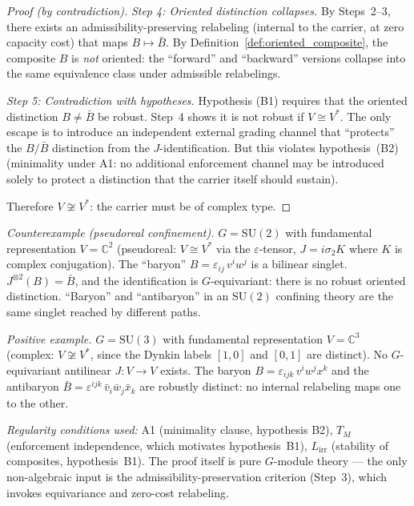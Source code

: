 \documentclass[11pt,a4paper]{article}
\theoremstyle{definition}
\newcommand{\SU}{\mathrm{SU}}
\begin{document}
\begin{proof}[Proof (by contradiction)]
\textit{Step 4: Oriented distinction collapses.}\quad
By Steps~2--3, there exists an admissibility-preserving relabeling
(internal to the carrier, at zero capacity cost) that maps $B \mapsto \bar{B}$.
By Definition~\ref{def:oriented_composite}, the composite $B$ is
\emph{not} oriented: the ``forward'' and ``backward'' versions collapse
into the same equivalence class under admissible relabelings.

\textit{Step 5: Contradiction with hypotheses.}\quad
Hypothesis (B1) requires that the oriented distinction $B \ne \bar{B}$ be
robust.  Step~4 shows it is not robust if $V \cong V^*$.  The only escape
is to introduce an independent external grading channel that ``protects''
the $B / \bar{B}$ distinction from the $J$-identification.  But this
violates hypothesis~(B2) (minimality under A1: no additional enforcement
channel may be introduced solely to protect a distinction that the carrier
itself should sustain).

Therefore $V \not\cong V^*$: the carrier must be of complex type.
\end{proof}

\noindent\textit{Counterexample (pseudoreal confinement).}\quad
$G = \SU(2)$ with fundamental representation $V = \mathbb{C}^2$
(pseudoreal: $V \cong V^*$ via the $\varepsilon$-tensor, $J = i\sigma_2 K$
where $K$ is complex conjugation).  The ``baryon'' $B = \varepsilon_{ij}\, v^i w^j$
is a bilinear singlet.  $J^{\otimes 2}(B) = \bar{B}$, and the identification
is $G$-equivariant: there is no robust oriented distinction.
``Baryon'' and ``antibaryon'' in an $\SU(2)$ confining theory are the
same singlet reached by different paths.

\smallskip\noindent\textit{Positive example.}\quad
$G = \SU(3)$ with fundamental representation $V = \mathbb{C}^3$
(complex: $V \not\cong V^*$, since the Dynkin labels $[1,0]$ and
$[0,1]$ are distinct).  No $G$-equivariant antilinear $J: V \to V$ exists.
The baryon $B = \varepsilon_{ijk}\, v^i w^j x^k$ and the antibaryon
$\bar{B} = \varepsilon^{ijk}\, \bar{v}_i \bar{w}_j \bar{x}_k$ are
robustly distinct: no internal relabeling maps one to the other.

\smallskip\noindent\textit{Regularity conditions used:}
A1 (minimality clause, hypothesis B2), $T_M$ (enforcement independence,
which motivates hypothesis~B1), $L_{\mathrm{irr}}$ (stability of composites,
hypothesis~B1).  The proof itself is pure $G$-module theory --- the only
non-algebraic input is the admissibility-preservation criterion (Step~3),
which invokes equivariance and zero-cost relabeling.
\end{document}
